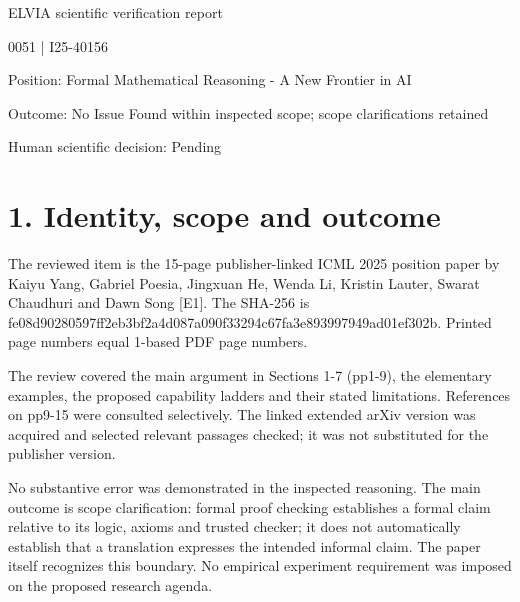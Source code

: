 \documentclass[10pt]{article}
\begin{document}
ELVIA scientific verification report\par
0051 | I25-40156\par
Position: Formal Mathematical Reasoning - A New Frontier in AI\par
Outcome: No Issue Found within inspected scope; scope clarifications retained\par
Human scientific decision: Pending\par
\section*{1. Identity, scope and outcome}
The reviewed item is the 15-page publisher-linked ICML 2025 position paper by Kaiyu Yang, Gabriel Poesia, Jingxuan He, Wenda Li, Kristin Lauter, Swarat Chaudhuri and Dawn Song [E1]. The SHA-256 is fe08d90280597ff2eb3bf2a4d087a090f33294c67fa3e893997949ad01ef302b. Printed page numbers equal 1-based PDF page numbers.\par
The review covered the main argument in Sections 1-7 (pp1-9), the elementary examples, the proposed capability ladders and their stated limitations. References on pp9-15 were consulted selectively. The linked extended arXiv version was acquired and selected relevant passages checked; it was not substituted for the publisher version.\par
No substantive error was demonstrated in the inspected reasoning. The main outcome is scope clarification: formal proof checking establishes a formal claim relative to its logic, axioms and trusted checker; it does not automatically establish that a translation expresses the intended informal claim. The paper itself recognizes this boundary. No empirical experiment requirement was imposed on the proposed research agenda.\par
\end{document}
